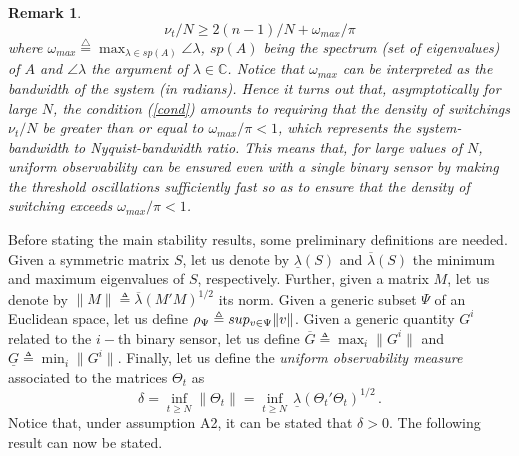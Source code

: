 \documentclass[11pt,journal,onecolumn]{IEEEtran}
\newtheorem{remark}{Remark}
\newcommand{\defi} { \stackrel{\bigtriangleup}{=} }
\begin{document}
\begin{remark}
\begin{equation}
\nu_t / N \geq 2 (n-1) /N  + \omega_{max} / \pi
\label{cond}
\end{equation}
where $\omega_{max} \defi \max_{\lambda \in sp(A)} \angle \lambda$, $sp(A)$ being the spectrum (set of eigenvalues) of $A$ and $\angle \lambda$
the argument of $\lambda \in \mathbb C$. Notice that $\omega_{max}$ can be interpreted as the bandwidth of the system (in radians).
Hence it turns out that, asymptotically for large $N$, the condition (\ref{cond}) amounts to requiring that the density of switchings $\nu_t / N$ be greater than or equal to $\omega_{max} / \pi < 1$, which represents the system-bandwidth to Nyquist-bandwidth ratio. This means that, for large values of $N$, uniform observability can be ensured even with a single binary sensor by making the threshold oscillations sufficiently fast so as to ensure that the density of switching exceeds $\omega_{max} / \pi < 1$.
\end{remark}

Before stating the main stability results, some preliminary definitions are needed. Given a symmetric matrix $S$, let us denote by $\underline{\lambda}(S)$ and $\overline{\lambda}(S)$ the minimum and maximum eigenvalues of $S$, respectively. Further, given a matrix $M$, let us denote by $\|M\|\triangleq\overline{\lambda}(M'M)^{1/2}$ its norm. Given a generic subset $\Psi$ of an Euclidean space, let us define
$ \rho_{\Psi}  \triangleq\overline  \rm sup_{v \in \Psi } \| v \|$. Given a generic quantity $G^{i}$ related to the $i-$th binary sensor, let us define $\overline{G}\triangleq\max_{i}\|G^{i}\|$ and $\underline{G}\triangleq\min_{i}\|G^{i}\|$. Finally, let us define the {\em uniform observability measure} associated to the matrices $\Theta_t$ as
\[
\delta = \inf_{t \ge N}  \left \| \Theta_t \right\| =  \inf_{t \ge N} {\, \underline{\lambda}(\Theta_{t}'\Theta_{t})^{1/2}} \, .
\]
Notice that, under assumption A2, it can be stated that $\delta >0$. The following result can now be stated. \vspace{.1 cm}
\end{document}
